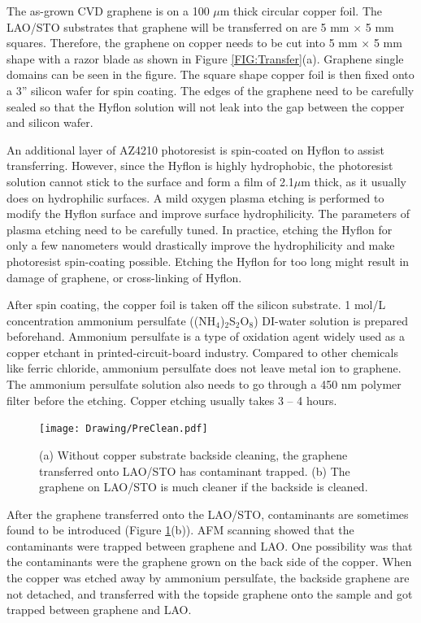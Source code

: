 \documentclass[pdflatex, sectionletters, 12pt]{pittetd}    %
\begin{document}
The as-grown CVD graphene is on a 100 $\mu$m thick circular copper foil. The LAO/STO substrates that graphene will be transferred on are 5 mm $\times$ 5 mm squares. Therefore, the graphene on copper needs to be cut into 5 mm $\times$ 5 mm shape with a razor blade as shown in Figure \ref{FIG:Transfer}(a). Graphene single domains can be seen in the figure. The square shape copper foil is then fixed onto a 3'' silicon wafer for spin coating. The edges of the graphene need to be carefully sealed so that the Hyflon solution will not leak into the gap between the copper and silicon wafer.

An additional layer of AZ4210 photoresist is spin-coated on Hyflon to assist transferring. However, since the Hyflon is highly hydrophobic, the photoresist solution cannot stick to the surface and form a film of 2.1$\mu$m thick, as it usually does on hydrophilic surfaces. A mild oxygen plasma etching is performed to modify the Hyflon surface and improve surface hydrophilicity. The parameters of plasma etching need to be carefully tuned. In practice, etching the Hyflon for only a few nanometers would drastically improve the hydrophilicity and make photoresist spin-coating possible. Etching the Hyflon for too long might result in damage of graphene, or cross-linking of Hyflon.

After spin coating, the copper foil is taken off the silicon substrate. 1 mol/L concentration ammonium persulfate ((NH$_4$)$_2$S$_2$O$_8$) DI-water solution is prepared beforehand. Ammonium persulfate is a type of oxidation agent widely used as a copper etchant in printed-circuit-board industry. Compared to other chemicals like ferric chloride, ammonium persulfate does not leave metal ion to graphene. The ammonium persulfate solution also needs to go through a 450 nm polymer filter before the etching. Copper etching usually takes 3 -- 4 hours. 

\begin{figure}[h!]
	\centering
	\texttt{[image: Drawing/PreClean.pdf]}
	\caption{(a) Without copper substrate backside cleaning, the graphene transferred onto LAO/STO has contaminant trapped. (b) The graphene on LAO/STO is much cleaner if the backside is cleaned.}
	\label{FIG:PreClean}
\end{figure}

After the graphene transferred onto the LAO/STO, contaminants are sometimes found to be introduced (Figure \ref{FIG:PreClean}(b)). AFM scanning showed that the contaminants were trapped between graphene and LAO. One possibility was that the contaminants were the graphene grown on the back side of the copper. When the copper was etched away by ammonium persulfate, the backside graphene are not detached, and transferred with the topside graphene onto the sample and got trapped between graphene and LAO. 
\end{document}
